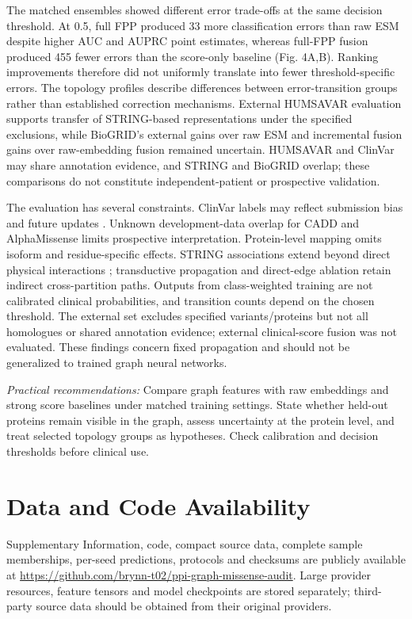 \documentclass[conference]{IEEEtran}
\begin{document}
The matched ensembles showed different error trade-offs at the same decision threshold. At 0.5, full FPP produced 33 more classification errors than raw ESM despite higher AUC and AUPRC point estimates, whereas full-FPP fusion produced 455 fewer errors than the score-only baseline (Fig. 4A,B). Ranking improvements therefore did not uniformly translate into fewer threshold-specific errors. The topology profiles describe differences between error-transition groups rather than established correction mechanisms. External HUMSAVAR evaluation supports transfer of STRING-based representations under the specified exclusions, while BioGRID's external gains over raw ESM and incremental fusion gains over raw-embedding fusion remained uncertain. HUMSAVAR and ClinVar may share annotation evidence, and STRING and BioGRID overlap; these comparisons do not constitute independent-patient or prospective validation.

The evaluation has several constraints. ClinVar labels may reflect submission bias and future updates \cite{Landrum2020ClinVar}. Unknown development-data overlap for CADD and AlphaMissense limits prospective interpretation. Protein-level mapping omits isoform and residue-specific effects. STRING associations extend beyond direct physical interactions \cite{Szklarczyk2023STRING}; transductive propagation and direct-edge ablation retain indirect cross-partition paths. Outputs from class-weighted training are not calibrated clinical probabilities, and transition counts depend on the chosen threshold. The external set excludes specified variants/proteins but not all homologues or shared annotation evidence; external clinical-score fusion was not evaluated. These findings concern fixed propagation and should not be generalized to trained graph neural networks.

\noindent\textit{Practical recommendations:}
Compare graph features with raw embeddings and strong score baselines under matched training settings. State whether held-out proteins remain visible in the graph, assess uncertainty at the protein level, and treat selected topology groups as hypotheses. Check calibration and decision thresholds before clinical use.

\section*{Data and Code Availability}

Supplementary Information, code, compact source data, complete sample memberships, per-seed predictions, protocols and checksums are publicly available at \url{https://github.com/brynn-t02/ppi-graph-missense-audit}. Large provider resources, feature tensors and model checkpoints are stored separately; third-party source data should be obtained from their original providers.
\end{document}
